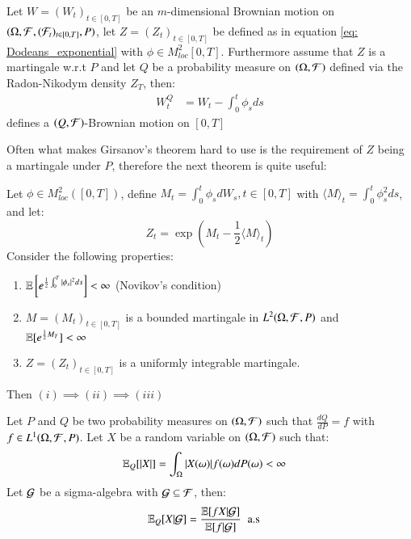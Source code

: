 \begin{theorem}
\label{thm: Girsanov's_thm}
Let $W = (W_{t})_{t\in [0,T]}$ be an $m$-dimensional Brownian motion on $(\Omega, \mathcal{F}, (\mathcal{F}_{t})_{t\in [0,T]}, P)$, let $Z = (Z_{t})_{t\in [0,T]}$  be defined as in equation \ref{eq: Dodeans_exponential} with $\phi \in M^{2}_{loc}[0,T]$. Furthermore assume that $Z$ is a martingale w.r.t $P$ and let $Q$ be a probability measure on $(\Omega, \mathcal{F})$ defined via the Radon-Nikodym density $Z_{T}$, then: 
\begin{align*}
W_{t}^{Q} &= W_{t} - \int_{0}^{t}\phi_{s}ds    
\end{align*}
defines a $(Q,\mathcal{F})$-Brownian motion on $[0,T]$
\end{theorem}

Often what makes Girsanov's theorem hard to use is the requirement of $Z$ being a martingale under $P$, therefore the next theorem is quite useful: 

\begin{theorem}
\label{thm: Novikov_cond_and_implications}
Let $\phi \in M^{2}_{loc}([0,T])$, define $M_{t} = \int_{0}^{t}\phi_{s}dW_{s}, t \in [0,T]$ with $\langle M \rangle_{t} = \int_{0}^{t}\phi^{2}_{s}ds$, and let: 
$$
Z_{t} = \exp\left(
M_{t} - \frac{1}{2}\langle M \rangle_{t}
\right)
$$
Consider the following properties: 
\begin{enumerate}[label= (\roman*), leftmargin=*]
    \item $\mathbb{E}\left[e^{\frac{1}{2}\int_{0}^{T}|\phi_{s}|^{2}ds}\right] < \infty$ (Novikov's condition)
    \item $M = (M_{t})_{t\in [0,T]}$ is a bounded martingale in $L^{2}(\Omega, \mathcal{F}, P)$ and \\ 
    $\mathbb{E}[e^{\frac{1}{2} M_{T}}] < \infty$ 
    \item $Z = (Z_{t})_{t\in [0,T]}$ is a uniformly integrable martingale. 
\end{enumerate}

Then $(i) \implies (ii) \implies (iii)$
\end{theorem} 

\begin{theorem}
\label{thm: Bayes_thm}
Let $P$ and $Q$ be two probability measures on $(\Omega, \mathcal{F})$ such that $\frac{dQ}{dP} = f$ with $f\in L^{1}(\Omega, \mathcal{F}, P)$. Let $X$ be a random variable on $(\Omega, \mathcal{F})$ such that: 
\begin{align*}
\mathbb{E}_{Q}[|X|] &= \int_{\Omega}|X(\omega)|f(\omega)dP(\omega) < \infty
\end{align*}
Let $\mathcal{G}$ be a sigma-algebra with $\mathcal{G} \subseteq \mathcal{F}$, then: 
\begin{align*}
\mathbb{E}_{Q}[X|\mathcal{G}] &= 
\frac{
\mathbb{E}[fX|\mathcal{G}]
}{
\mathbb{E}[f|\mathcal{G}]
}\;\; \text{a.s}
\end{align*}
\end{theorem}

